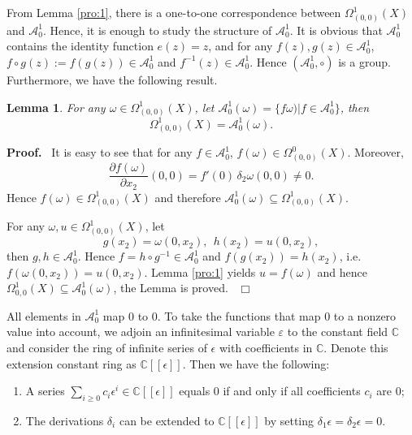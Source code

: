 \documentclass[preprint, 12pt]{elsarticle}
\newtheorem{lem}[thm]{Lemma}
\numberwithin{equation}{section}
\newenvironment{proof}[1][Proof]{\textbf{#1.}\ }{\ $\Box$}
\newcommand{\Comp}{\mathbb{C}}
\newcommand{\eps}{\varepsilon}
\newcommand{\A}{\mathcal{A}}
\begin{document}
From Lemma \ref{pro:1}, there is a one-to-one correspondence
between $\Omega_{(0,0)}^1(X)$ and $\A_0^1$. Hence, it is enough to study the structure of $\A_0^1$. It
is obvious that $\A_0^1$ contains the identity function $e(z) =
z$, and for any $f(z), g(z)\in \A_0^1$, $f\circ g(z) := f(g(z))\in \A_0^1$
and $f^{-1}(z)\in \A_0^1$. Hence $(\A_0^1,\circ)$ is a group. Furthermore, we have the
following result.
\begin{lem}
\label{pro:4} For any $\omega\in\Omega_{(0,0)}^1(X)$, let $\A_0^1(\omega)=\{f\omega)| f\in \A_0^1\}$, then
$$\Omega_{(0,0)}^1(X) =\A_0^1(\omega).$$
\end{lem}
\begin{proof}
It is easy to see that for any $f\in \A_0^1$, $f(\omega)\in \Omega_{(0,0)}^0(X)$. Moreover,
$$\frac{\partial f(\omega)}{\partial x_2}(0,0) = f'(0)\,\delta_2\omega(0,0)\not=0.$$
Hence $f(\omega)\in \Omega_{(0,0)}^1(X)$ and therefore
$\A_0^1(\omega)\subseteq \Omega_{(0,0)}^1(X)$.

For any $\omega, u\in \Omega_{(0,0)}^1(X)$, let
$$g(x_2)= \omega(0,x_2),\ \ h(x_2) = u(0,x_2),$$
then $g,h\in \A_0^1$. Hence $f = h\circ g^{-1}\in \A_0^1$ and
$f(g(x_2)) = h(x_2)$, i.e. $f(\omega(0,x_2)) = u(0,x_2)$. Lemma \ref{pro:1} yields $u = f(\omega)$ and hence
$\Omega_{0,0}^1(X)\subseteq \A_0^1(\omega)$, the Lemma is
proved.
\end{proof}

All elements in $\A_0^1$ map $0$ to $0$. To take the functions that
map $0$ to a nonzero value into account, we adjoin an
infinitesimal variable $\eps$ to the constant field $\Comp$ and
consider the ring of infinite series of $\epsilon$ with
coefficients in $\Comp$. Denote this extension constant ring as
$\Comp[[\epsilon]]$. Then we have the following:
\begin{enumerate}
\item A series $\sum_{i\geq 0}c_i\epsilon^i \in \Comp[[\epsilon]]$ equals $0$ if and
only if all coefficients $c_i$ are $0$; 
\item The derivations $\delta_i$ can be extended to $\Comp[[\epsilon]]$ by setting $\delta_1 \epsilon = \delta_2\epsilon = 0$.
\end{enumerate}
\end{document}
